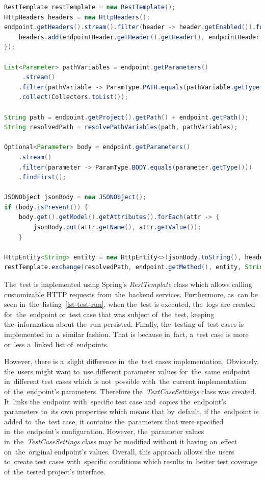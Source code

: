 \vspace{1mm}
\begin{lstlisting}[caption=The~implementation of~a~test run in~backend's service.,
style=dp-default, language=Java, label=lst-test-run]
RestTemplate restTemplate = new RestTemplate();
HttpHeaders headers = new HttpHeaders();
endpoint.getHeaders().stream().filter(header -> header.getEnabled()).forEach(endpointHeader -> {
	headers.add(endpointHeader.getHeader().getHeader(), endpointHeader.getHeader().getValue());
});

List<Parameter> pathVariables = endpoint.getParameters()
	 .stream()
    .filter(pathVariable -> ParamType.PATH.equals(pathVariable.getType()))
    .collect(Collectors.toList());

String path = endpoint.getProject().getPath() + endpoint.getPath();
String resolvedPath = resolvePathVariables(path, pathVariables);
            
Optional<Parameter> body = endpoint.getParameters()
	.stream()
    .filter(parameter -> ParamType.BODY.equals(parameter.getType()))
    .findFirst();
    
JSONObject jsonBody = new JSONObject();
if (body.isPresent()) {
	body.get().getModel().getAttributes().forEach(attr -> {
		jsonBody.put(attr.getName(), attr.getValue());
	}
            
HttpEntity<String> entity = new HttpEntity<>(jsonBody.toString(), headers);
restTemplate.exchange(resolvedPath, endpoint.getMethod(), entity, String.class);
\end{lstlisting}

The~test is implemented using Spring's \textit{RestTemplate} class which allows calling customizable HTTP requests from~the~backend
services. Furthermore, as~can be seen in~the~listing~\ref{lst-test-run}, when the~test is executed, the~logs are created for~the~endpoint or~test case
that was subject of~the~test, keeping the~information about the~run persisted. Finally, the~testing of~test cases is implemented in~a~similar fashion.
That is because in~fact, a~test case is more or~less a~linked list of~endpoints.

However, there is a~slight difference in~the~test cases implementation. Obviously, the~users might want to~use different parameter values for~the~same
endpoint in~different test cases which is not~possible with~the~current implementation of~the~endpoint's parameters. Therefore the~\textit{TextCaseSettings}
class was created. It~links the~endpoint with~specific test case and~copies the~endpoint's parameters to~its own properties which means that by~default,
if the~endpoint is added to~the~test case, it contains the~parameters that were specified in~the~endpoint's configuration. However, the~parameter values
in~the~\textit{TestCaseSettings} class may be modified without it having an~effect on~the~original endpoint's values. Overall, this approach allows the~users
to~create test cases with~specific conditions which results in~better test coverage of~the~tested project's interface.


